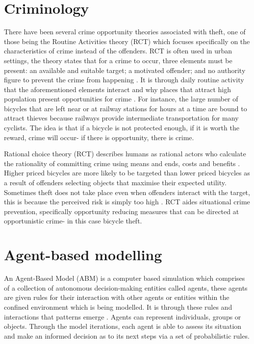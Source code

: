 \documentclass[11pt]{informatics-report}
\begin{document}
\section{Criminology}
There have been several crime opportunity theories associated with theft, one of those being the Routine Activities theory (RCT) \cite{cohen} which focuses specifically on the characteristics of crime instead of the offenders. RCT is often used in urban settings, the theory states that for a crime to occur, three elements must be present: an available and suitable target; a motivated offender; and no authority figure to prevent the crime from happening \cite{rational}. It is through daily routine activity that the aforementioned elements interact and why places that attract high population present opportunities for crime \cite{sherman}. For instance, the large number of bicycles that are left near or at railway stations for hours at a time are bound to attract thieves because railways provide intermediate transportation for many cyclists. The idea is that if a bicycle is not protected enough, if it is worth the reward, crime will occur- if there is opportunity, there is crime. \par

Rational choice theory (RCT) describes humans as rational actors who calculate the rationality of committing crime using means and ends, costs and benefits \cite{cornishclarke}. Higher priced bicycles are more likely to be targeted than lower priced bicycles as a result of offenders selecting objects that maximise their expected utility. Sometimes theft does not take place even when offenders interact with the target, this is because the perceived risk is simply too high \cite{environment}. RCT aides situational crime prevention, specifically opportunity reducing measures that can be directed at opportunistic crime- in this case bicycle theft. \par


\section{Agent-based modelling}
An Agent-Based Model (ABM) is a computer based simulation which comprises of a collection of autonomous decision-making entities called agents, these agents are given rules for their interaction with other agents or entities within the confined environment which is being modelled. It is through these rules and interactions that patterns emerge \cite{abm}. Agents can represent individuals, groups or objects. Through the model iterations, each agent is able to assess its situation and make an informed decision as to its next steps via a set of probabilistic rules.\par
\end{document}
